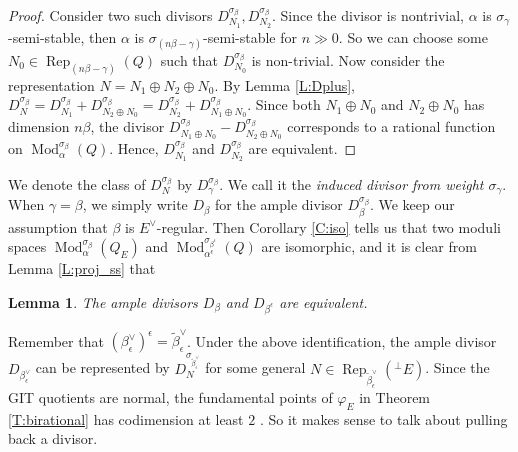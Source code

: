 \documentclass{amsart}
\newtheorem{lemma}[theorem]{Lemma}
\theoremstyle{definition}
\theoremstyle{remark}
\numberwithin{equation}{section}
\begin{document}
\begin{proof} Consider two such divisors $D_{N_1}^{\sigma_\beta}, D_{N_2}^{\sigma_\beta}$. Since the divisor is nontrivial, $\alpha$ is $\sigma_\gamma$-semi-stable, then $\alpha$ is $\sigma_{(n\beta-\gamma)}$-semi-stable for $n\gg 0$. So we can choose some $N_0\in{\operatorname{Rep}}_{(n\beta-\gamma)}(Q)$ such that $D_{N_0}^{\sigma_\beta}$ is non-trivial. Now consider the representation $N=N_1\oplus N_2\oplus N_0$. By Lemma \ref{L:Dplus}, $D_N^{\sigma_\beta}=D_{N_1}^{\sigma_\beta}+D_{N_2\oplus N_0}^{\sigma_\beta}=D_{N_2}^{\sigma_\beta}+D_{N_1\oplus N_0}^{\sigma_\beta}$. Since both $N_1\oplus N_0$ and $N_2\oplus N_0$ has dimension $n\beta$, the divisor $D_{N_1\oplus N_0}^{\sigma_\beta}-D_{N_2\oplus N_0}^{\sigma_\beta}$ corresponds to a rational function on ${\operatorname{Mod}}_\alpha^{\sigma_\beta}(Q)$. Hence, $D_{N_1}^{\sigma_\beta}$ and $D_{N_2}^{\sigma_\beta}$ are equivalent.
\end{proof}

We denote the class of $D_N^{\sigma_\beta}$ by $D_\gamma^{\sigma_\beta}$. We call it the {\em induced divisor from weight $\sigma_\gamma$}. When $\gamma=\beta$, we simply write $D_\beta$ for the ample divisor $D_\beta^{\sigma_\beta}$. We keep our assumption that $\beta$ is $E^\vee$-regular. Then Corollary \ref{C:iso} tells us that two moduli spaces ${\operatorname{Mod}}_\alpha^{\sigma_\beta}(Q_E)$ and ${\operatorname{Mod}}_{\alpha^\epsilon}^{\sigma_{\beta^\epsilon}}(Q)$ are isomorphic, and it is clear from Lemma \ref{L:proj_ss} that

\begin{lemma} The ample divisors $D_\beta$ and $D_{\beta^\epsilon}$ are equivalent.
\end{lemma}

Remember that $(\beta_\epsilon^\vee)^\epsilon=\tilde{\beta}_\epsilon^\vee$. Under the above identification, the ample divisor $D_{\beta_\epsilon^\vee}$ can be represented by $D_N^{\sigma_{\tilde{\beta}_\epsilon^\vee}}$
for some general $N\in{\operatorname{Rep}}_{\tilde{\beta}_\epsilon^\vee}({{^\perp}\!} E)$.
Since the GIT quotients are normal, the fundamental points of $\varphi_E$ in Theorem \ref{T:birational} has codimension at least $2$ \cite[Lemma V.5.1]{Ha}. So it makes sense to talk about pulling back a divisor.
\end{document}
